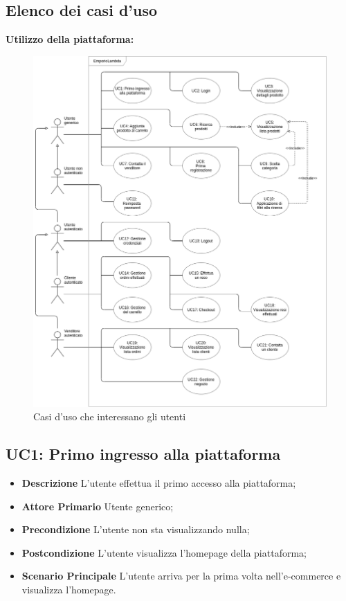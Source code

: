 \begin{itemize}
\begin{itemize}
\begin{figure}[!ht]
                            \centering
                        \end{figure}
                \end{itemize}
        \end{itemize}
        \newpage
    \subsection{Elenco dei casi d'uso}
        \textbf{Utilizzo della piattaforma:}
        \begin{figure}[!ht]
            \caption{Casi d'uso che interessano gli utenti}
            \vspace{10px}
            \includegraphics[scale=0.5]{../../../Images/casiUso.png}
            \centering
        \end{figure}
        \subsection{UC1: Primo ingresso alla piattaforma}
        \begin{itemize}
            \item \textbf{Descrizione} L'utente effettua il primo accesso alla piattaforma;
            \item \textbf{Attore Primario} Utente generico;
            \item \textbf{Precondizione} L'utente non sta visualizzando nulla;
            \item \textbf{Postcondizione} L'utente visualizza l'homepage della piattaforma;
            \item \textbf{Scenario Principale} L'utente arriva per la prima volta nell'e-commerce e visualizza l'homepage.
        \end{itemize}
